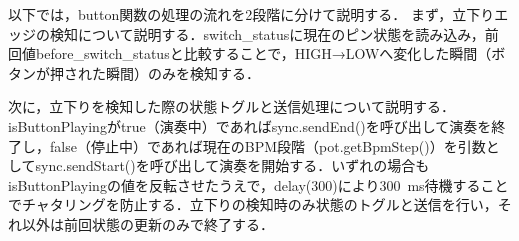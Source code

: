 \iffalse

以下では，button関数の処理の流れを2段階に分けて説明する．
まず，立下りエッジの検知について説明する．switch\_statusに現在のピン状態を読み込み，前回値before\_switch\_statusと比較することで，HIGH→LOWへ変化した瞬間（ボタンが押された瞬間）のみを検知する．




次に，立下りを検知した際の状態トグルと送信処理について説明する．
isButtonPlayingがtrue（演奏中）であればsync.sendEnd()を呼び出して演奏を終了し，false（停止中）であれば現在のBPM段階（pot.getBpmStep()）を引数としてsync.sendStart()を呼び出して演奏を開始する．いずれの場合もisButtonPlayingの値を反転させたうえで，delay(300)により\SI{300}{ms}待機することでチャタリングを防止する．立下りの検知時のみ状態のトグルと送信を行い，それ以外は前回状態の更新のみで終了する．

